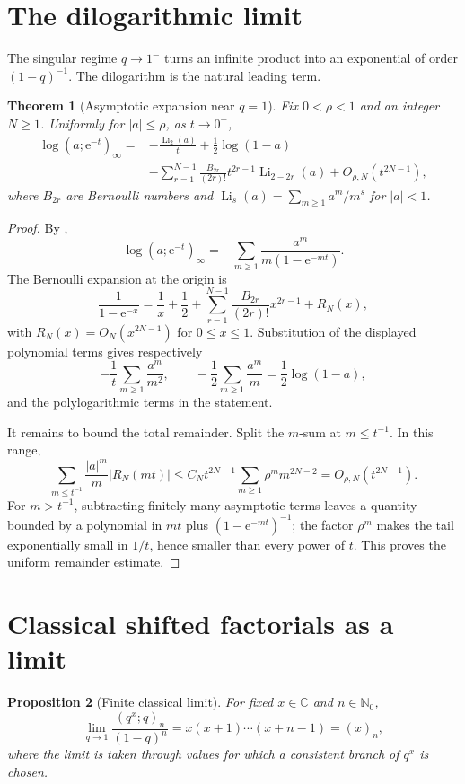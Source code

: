 \documentclass[11pt,oneside,openany]{book}
\newtheorem{theorem}{Theorem}[chapter]
\newtheorem{proposition}[theorem]{Proposition}
\theoremstyle{definition}
\theoremstyle{remark}
\newcommand{\C}{\mathbb C}
\newcommand{\N}{\mathbb N}
\newcommand{\Li}{\operatorname{Li}}
\newcommand{\e}{\mathrm e}
\newcommand{\abs}[1]{\lvert #1\rvert}
\begin{document}
\section{The dilogarithmic limit}

The singular regime $q\to1^-$ turns an infinite product into an exponential of order $(1-q)^{-1}$.  The dilogarithm is the natural leading term.

\begin{theorem}[Asymptotic expansion near $q=1$]\label{thm:poch-dilog}
Fix $0<\rho<1$ and an integer $N\ge1$.  Uniformly for $\abs a\le\rho$, as $t\to0^+$,
\[
\begin{aligned}
 \log(a;\e^{-t})_\infty
 ={}&-\frac{\Li_2(a)}{t}+\frac12\log(1-a)\\
 &-\sum_{r=1}^{N-1}\frac{B_{2r}}{(2r)!}
 t^{2r-1}\Li_{2-2r}(a)+O_{\rho,N}(t^{2N-1}),
\end{aligned}
\]
where $B_{2r}$ are Bernoulli numbers and
\(
 \Li_s(a)=\sum_{m\ge1}a^m/m^s
\)
for $\abs a<1$.
\end{theorem}

\begin{proof}
By ,
\[
 \log(a;\e^{-t})_\infty
 =-\sum_{m\ge1}\frac{a^m}{m(1-\e^{-mt})}.
\]
The Bernoulli expansion at the origin is
\[
 \frac1{1-\e^{-x}}
 =\frac1x+\frac12+\sum_{r=1}^{N-1}
 \frac{B_{2r}}{(2r)!}x^{2r-1}+R_N(x),
\]
with $R_N(x)=O_N(x^{2N-1})$ for $0\le x\le1$.  Substitution of the displayed polynomial terms gives respectively
\[
 -\frac1t\sum_{m\ge1}\frac{a^m}{m^2},
 \qquad
 -\frac12\sum_{m\ge1}\frac{a^m}{m}=\frac12\log(1-a),
\]
and the polylogarithmic terms in the statement.

It remains to bound the total remainder.  Split the $m$-sum at $m\le t^{-1}$.  In this range,
\[
 \sum_{m\le t^{-1}}\frac{\abs a^m}{m}\abs{R_N(mt)}
 \le C_Nt^{2N-1}\sum_{m\ge1}\rho^m m^{2N-2}
 =O_{\rho,N}(t^{2N-1}).
\]
For $m>t^{-1}$, subtracting finitely many asymptotic terms leaves a quantity bounded by a polynomial in $mt$ plus $(1-\e^{-mt})^{-1}$; the factor $\rho^m$ makes the tail exponentially small in $1/t$, hence smaller than every power of $t$.  This proves the uniform remainder estimate.
\end{proof}

\section{Classical shifted factorials as a limit}

\begin{proposition}[Finite classical limit]\label{prop:classical-poch-limit}
For fixed $x\in\C$ and $n\in\N_0$,
\[
 \lim_{q\to1}\frac{(q^x;q)_n}{(1-q)^n}
 =x(x+1)\cdots(x+n-1)=(x)_n,
\]
where the limit is taken through values for which a consistent branch of $q^x$ is chosen.
\end{proposition}
\end{document}
